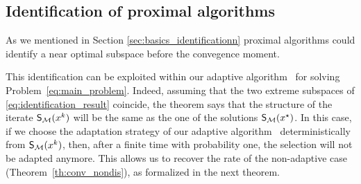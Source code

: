 


\subsection{Identification of proximal algorithms}\label{sec:identif}
{As we mentioned in Section \ref{sec:basics_identificationn} proximal algorithms could identify a near optimal subspace before the convegence moment.}

This identification can be exploited within our adaptive algorithm \adaalgo~for solving Problem~\eqref{eq:main_problem}. Indeed, assuming that the two extreme subspaces of \eqref{eq:identification_result} coincide, the theorem says that the structure of the iterate $\S(x^k)$ will be the same as the one of the solutions $\S(x^\star)$. In this case, if we choose the adaptation strategy of our adaptive algorithm \adaalgo~deterministically from $\S(x^k)$, then, after a finite time with probability one,  the selection will not be adapted anymore. This allows us to recover the rate of the non-adaptive case (Theorem~\ref{th:conv_nondis}), as formalized in the next theorem.


